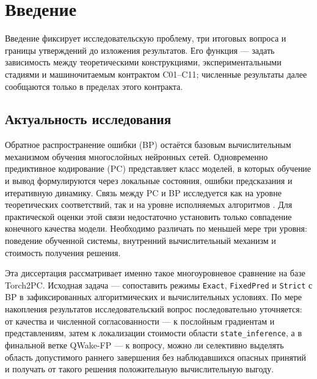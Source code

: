 \chapter{Введение}
\label{chap:introduction}

Введение фиксирует исследовательскую проблему, три итоговых вопроса и границы
утверждений до изложения результатов. Его функция --- задать зависимость между
теоретическими конструкциями, экспериментальными стадиями и машиночитаемым
контрактом C01--C11; численные результаты далее сообщаются только в пределах
этого контракта.

\section{Актуальность исследования}

Обратное распространение ошибки (BP) остаётся базовым вычислительным
механизмом обучения многослойных нейронных сетей. Одновременно предиктивное
кодирование (PC) представляет класс моделей, в которых обучение и вывод
формулируются через локальные состояния, ошибки предсказания и итеративную
динамику. Связь между PC и BP исследуется как на уровне теоретических
соответствий, так и на уровне исполняемых алгоритмов
\cite{rao1999predictive,whittington2017approximation,rosenbaum2022relationship,rosenbaum2025correction}.
Для практической оценки этой связи недостаточно установить только совпадение
конечного качества модели. Необходимо различать по меньшей мере три уровня:
поведение обученной системы, внутренний вычислительный механизм и стоимость
получения решения.

Эта диссертация рассматривает именно такое многоуровневое сравнение на базе
Torch2PC. Исходная задача --- сопоставить режимы \texttt{Exact},
\texttt{FixedPred} и \texttt{Strict} с BP в зафиксированных алгоритмических и
вычислительных условиях. По мере накопления результатов исследовательский
вопрос последовательно уточняется: от качества и численной согласованности ---
к послойным градиентам и представлениям, затем к локализации стоимости области
\texttt{state\_inference}, а в финальной ветке QWake-FP --- к вопросу, можно ли
селективно выделять область допустимого раннего завершения без наблюдавшихся
опасных принятий и получать от такого решения положительную вычислительную
выгоду.

